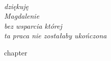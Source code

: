 \documentclass[
  a4paper,
  twoside,
  justified,
  nobib,
  marginals=raggedright,
]{tufte-book}
\begin{document}
\frontmatter
\maketitle

\cleardoublepage
\thispagestyle{empty}
~\vfill
\vfill
\begin{fullwidth}
\raggedleft\noindent\fontsize{16}{26}\selectfont\itshape
\nohyphenation
dziękuję \\
Magdalenie \\
bez wsparcia której \\
ta praca nie zostałaby ukończona
\end{fullwidth}
\vfill

\tableofcontents



\mainmatter

{chapter}


\end{document}
